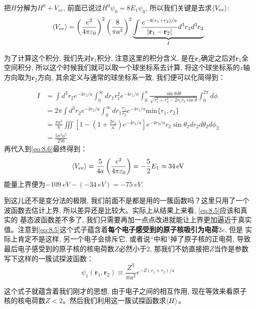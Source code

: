 \documentclass[a4paper,zihao=-4,linespread=1]{ctexrep}
\begin{document}
    把$H$分解为$H^0+V_{ee}$, 前面已说过$H^0\psi_0=8E_1\psi_0$, 所以我们关键是去求$\braket{V_{ee}}$:
    \begin{equation}
        \label{eq:8.6}
        \braket{V_{ee}}=\left(\frac{e^2}{4\pi\varepsilon_0}\right)^2\left(\frac{8}{\pi a^3}\right)^2\underbrace{\int\frac{e^{-4(r_1+r_2)/a}}{|\mathbf{r}_1-\mathbf{r}_2|}d^3r_1d^3r_2}_{I}
    \end{equation}
    
    为了计算这个积分, 我们先对$\mathbf{r}_1$积分, 注意这里的积分含义, 是在$\mathbf{r}_2$确定之后对$\mathbf{r}_1$全空间积分, 所以这个时候我们就可以取一个球坐标系去计算,
    将这个球坐标系的$z$轴方向取为$\mathbf{r}_2$方向, 其余定义与通常的球坐标系一致, 我们便可以化简得到：

    \begin{align*}
        I&=\int d^3r_2e^{-4r_2/a}\int^{\infty}_{0}dr_1 r_1^2e^{-4r_1/a}\int_0^\pi\frac{\sin\theta d\theta}{\sqrt{r_1^2+r_2^2-2r_1r_2\cos\theta}}\int_0^{2\pi}d\phi\\
        &=2\pi\int d^3r_2e^{-4r_2/a}\int^{\infty}_{0}dr_1 \frac{r_1}{r_2}e^{-4r_1/a}\mathrm{min}\{r_1,r_2\}\\
        &=\frac{\pi a^{3}}{8}\iiint\left[1-\left(1+\frac{2 r_{2}}{a}\right) e^{-4 r_{2} / a}\right] e^{-4 r_{2} / a} r_{2} \sin \theta_{2} d r_{2} d \theta_{2} d \phi_{2}\\
        &=\frac{5\pi^2a^5}{256}
    \end{align*} 
    再代入到\ref{eq:8.6}最终得到：
    \[\braket{V_{ee}}=\frac{5}{4a}\left(\frac{e^2}{4\pi\varepsilon_0}\right)=-\frac{5}{2}E_1\approx\SI[]{34}{eV}\]
    能量上界便为$\SI[]{-109}{eV}-(\SI[]{-34}{eV})=\SI[]{-75}{eV}$.

    到这儿还不是变分法的极限, 我们前面不是都是用的一簇函数吗？这里只用了一个波函数去估计上界, 所以差异还是比较大。实际上从结果上来看, \ref{eq:8.5}应该和真实的
    基态波函数差不多了, 我们只需要再加一点点改进就能让上界更加逼近于真实值。注意到\ref{eq:8.5}这个式子蕴含着\textbf{每个电子感受到的原子核吸引为电荷$2e$}, 但是
    实际上肯定不是这样, 另一个电子会排斥它, 或者说“中和”掉了原子核的正电荷, 导致最后电子感受到的原子核的核电荷数$Z$必然小于2, 那我们不妨直接把$Z$当作是参数写下这样的一簇试探波函数：
    \begin{equation}
        \label{eq:8.7}
        \psi_{1}\left(\mathbf{r}_{1}, \mathbf{r}_{2}\right) \equiv \frac{Z^{3}}{\pi a^{3}} e^{-Z\left(r_{1}+r_{2}\right) / a}
    \end{equation}
    
    这个式子就蕴含着我们刚才的思想, 由于电子之间的相互作用, 现在等效来看原子核的核电荷数$Z<2$。然后我们利用这一簇试探函数求$\braket{H}$。
\end{document}
